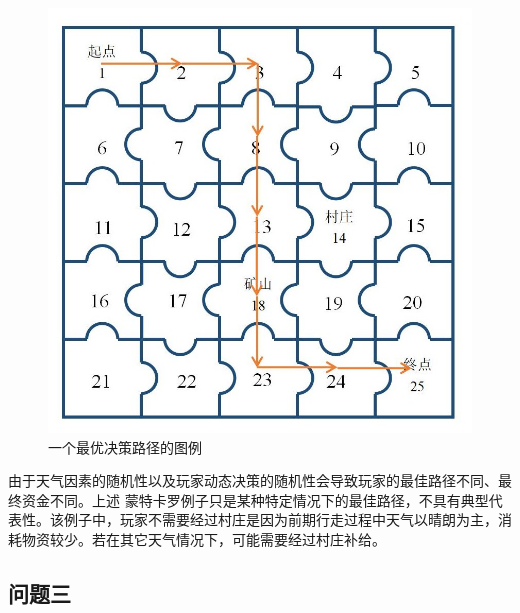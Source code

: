 \documentclass[withoutpreface,bwprint]{cumcmthesis} %
\begin{document}
\begin{figure}[H]
	\centering
	\includegraphics[scale=0.5]{figures/map4path.jpg}
	\caption{一个最优决策路径的图例}
	\label{fig:map4path}
\end{figure}

由于天气因素的随机性以及玩家动态决策的随机性会导致玩家的最佳路径不同、最终资金不同。上述
蒙特卡罗例子只是某种特定情况下的最佳路径，不具有典型代表性。该例子中，玩家不需要经过村庄是因为前期行走过程中天气以晴朗为主，消耗物资较少。若在其它天气情况下，可能需要经过村庄补给。

\subsection{问题三}
\end{document}

